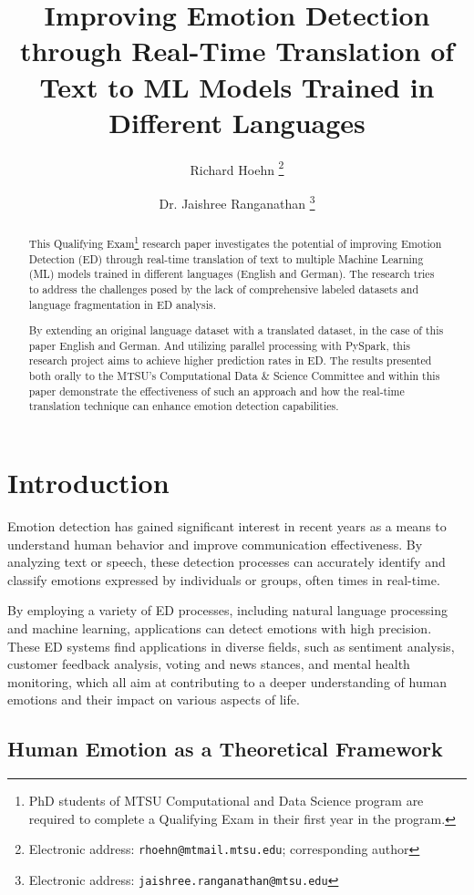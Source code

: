 \documentclass[11pt]{article}
\title{Improving Emotion Detection through Real-Time Translation of Text to ML Models Trained in Different Languages}
\author{Richard Hoehn%
	\thanks{Electronic address: \texttt{rhoehn@mtmail.mtsu.edu}; corresponding author}}
\affil{Middle Tennessee State University}
\author{Dr. Jaishree Ranganathan%
	\thanks{Electronic address: \texttt{jaishree.ranganathan@mtsu.edu}}}
\affil{Middle Tennessee State University}
\begin{document}
\maketitle

\begin{abstract}
This Qualifying Exam\footnote{PhD students of MTSU Computational and Data  Science program are required to complete a Qualifying Exam in their first year in the program.} research paper investigates the potential of improving Emotion Detection (ED) through real-time translation of text to multiple Machine Learning (ML) models trained in different languages (English and German). The research tries to address the challenges posed by the lack of comprehensive labeled datasets and language fragmentation in ED analysis. 

By extending an original language dataset with a translated dataset, in the case of this paper English and German. And utilizing parallel processing with PySpark, this research project aims to achieve higher prediction rates in ED. The results presented both orally to the MTSU's Computational Data \& Science Committee and within this paper demonstrate the effectiveness of such an approach and how the real-time translation technique can enhance emotion detection capabilities.
\end{abstract}
\clearpage

\tableofcontents
\clearpage

\section{Introduction}

Emotion detection has gained significant interest in recent years as a means to understand human behavior and improve communication effectiveness. By analyzing text or speech, these detection processes can accurately identify and classify emotions expressed by individuals or groups, often times in real-time.

By employing a variety of ED processes, including natural language processing and machine learning, applications can detect emotions with high precision. These ED systems find applications in diverse fields, such as sentiment analysis, customer feedback analysis, voting and news stances, and mental health monitoring, which all aim at contributing to a deeper understanding of human emotions and their impact on various aspects of life.

\subsection{Human Emotion as a Theoretical Framework}
\end{document}
